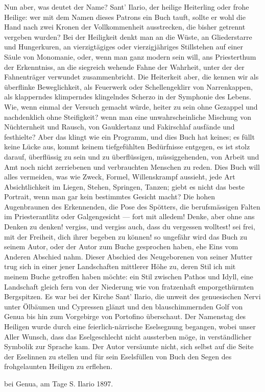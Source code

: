 Nun aber, was deutet der Name? Sant’ Ilario, der heilige Heiterling oder frohe Heilige: wer mit dem Namen dieses Patrons ein Buch tauft, sollte er wohl die Hand nach zwei Kronen der Vollkommenheit ausstrecken, die bisher getrennt vergeben wurden? Bei der Heiligkeit denkt man an die Wüste, an Gliederstarre und Hungerkuren, an vierzigtägiges oder vierzigjähriges Stillstehen auf einer Säule von Monomanie, oder, wenn man ganz modern sein will, ans Priesterthum der Erkenntniss, an die siegreich wehende Fahne der Wahrheit, unter der der Fahnenträger verwundet zusammenbricht. Die Heiterkeit aber, die kennen wir als überflinke Beweglichkeit, als Feuerwerk oder Schellengeklirr von Narrenkappen, als klapperndes klimperndes klingelndes Scherzo in der Symphonie des Lebens. Wie, wenn einmal der Versuch gemacht würde, heiter zu sein ohne Gezappel und nachdenklich ohne Steifigkeit? wenn man eine unwahrscheinliche Mischung von Nüchternheit und Rausch, von Gauklertanz und Fakirschlaf ausfände und festhielte? Aber das klingt wie ein Programm, und dies Buch hat keines; es füllt keine Lücke aus, kommt keinem tiefgefühlten Bedürfnisse entgegen, es ist stolz darauf, überflüssig zu sein und zu überflüssigen, müssiggehenden, von Arbeit und Amt noch nicht zerriebenen und verbrauchten Menschen zu reden. Dies Buch will alles vermeiden, was wie Zweck, Formel, Willenskrampf aussieht, jede Art Absichtlichkeit im Liegen, Stehen, Springen, Tanzen; giebt es nicht das beste Portrait, wenn man gar kein bestimmtes Gesicht macht? Die hohen Augenbraunen des Erkennenden, die Pose des Spötters, die berufsmässigen Falten im Priesterantlitz oder Galgengesicht — fort mit alledem! Denke, aber ohne ans Denken zu denken! vergiss, und vergiss auch, dass du vergessen wolltest! sei frei, mit der Freiheit, dich ihrer begeben zu können! so ungefähr wird das Buch zu seinem Autor, oder der Autor zum Buche gesprochen haben, ehe Eins vom Anderen Abschied nahm. Dieser Abschied des Neugeborenen von seiner Mutter trug sich in einer jener Landschaften mittlerer Höhe zu, deren Stil ich mit meinem Buche getroffen haben möchte: ein Stil zwischen Pathos und Idyll, eine Landschaft gleich fern von der Niederung wie von fratzenhaft emporgethürmten Bergspitzen. Es war bei der Kirche Sant’ Ilario, die unweit des genuesischen Nervi unter Ölbäumen und Cypressen glänzt und den blauschimmernden Golf von Genua bis hin zum Vorgebirge von Portofino überschaut. Der Namenstag des Heiligen wurde durch eine feierlich-närrische Eselsegnung begangen, wobei unser Aller Wunsch, dass das Eselgeschlecht nicht aussterben möge, in verständlicher Symbolik zur Sprache kam. Der Autor versäumte nicht, sich selbst auf die Seite der Eselinnen zu stellen und für sein Eselsfüllen von Buch den Segen des frohgelaunten Heiligen zu erflehen.
\par

 bei Genua, am Tage S. Ilario 1897.
\par

